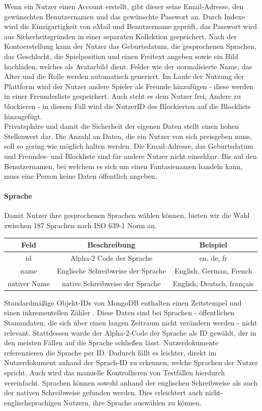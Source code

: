 Wenn ein Nutzer einen Account erstellt, gibt dieser seine Email-Adresse, den gewünschten Benutzernamen und das gewünschte Passwort an. 
Durch Indexe wird die Einzigartigkeit von eMail und Benutzername geprüft, das Passwort wird aus Sicherheitsgründen in einer separaten Kollektion gespeichert.
Nach der Kontoerstellung kann der Nutzer das Geburtsdatum, die gesprochenen Sprachen, das Geschlecht, die Spielposition und einen Freitext angeben sowie ein Bild hochladen, welches als Avatarbild dient.
Felder wie der normalisierte Name, das Alter und die Rolle werden automatisch generiert.
Im Laufe der Nutzung der Plattform wird der Nutzer andere Spieler als Freunde hinzufügen - diese werden in einer Freundesliste gespeichert.
Auch steht es dem Nutzer frei, Andere zu blockieren - in diesem Fall wird die NutzerID des Blockierten auf die Blockliste hinzugefügt. \\
Privatsphäre und damit die Sicherheit der eigenen Daten stellt einen hohen Stellenwert dar.
Die Anzahl an Daten, die ein Nutzer von sich preisgeben muss, soll so gering wie möglich halten werden.
Die Email-Adresse, das Geburtsdatum und Freundes- und Blockliste sind für andere Nutzer nicht einsehbar.
Bis auf den Benutzernamen, bei welchem es sich um einen Fantasienamen handeln kann, muss eine Person keine Daten öffentlich angeben.

\paragraph{Sprache\\}
Damit Nutzer ihre gesprochenen Sprachen wählen können, bieten wir die Wahl zwischen 187 Sprachen nach ISO 639-1 Norm an.\cite{ISO639-1}\\

\begin{center}
    \begin{tabular}{ |c|c|c| }
        \hline
        Feld & Beschreibung & Beispiel \\
        \hline
        id & Alpha-2 Code der Sprache & en, de, fr \\
        name & Englische Schreibweise der Sprache & English, German, French \\
        nativer Name & native Schreibweise der Sprache & English, Deutsch, français \\
        \hline
    \end{tabular}
\end{center}
Standardmäßige Objekt-IDs von MongoDB enthalten einen Zeitstempel und einen inkrementellen Zähler \cite{MG11}.
 Diese Daten sind bei Sprachen - öffentlichen Stammdaten, die sich über einen langen Zeitraum nicht verändern werden - nicht relevant.
Stattdessen wurde der Alpha-2-Code der Sprache als ID gewählt, der in den meisten Fällen auf die Sprache schließen lässt.
Nutzerdokumente referenzieren die Sprache per ID.
Dadurch fällt es leichter, direkt im Nutzerdokument anhand der Sprach-ID zu erkennen, welche Sprachen der Nutzer spricht.
Auch wird das manuelle Kontrollieren von Testfällen hierdurch vereinfacht.
Sprachen können sowohl anhand der englischen Schreibweise als auch der nativen Schreibweise gefunden werden.
Dies erleichtert auch nicht-englischsprachigen Nutzern, ihre Sprache auswählen zu können.

